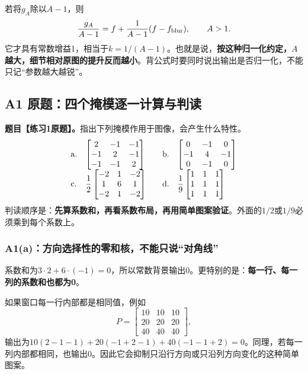 若将$g_A$除以$A-1$，则
\[
 \frac{g_A}{A-1}
 =f+\frac1{A-1}(f-f_{\rm blur}),\qquad A>1.
\]
它才具有常数增益1，相当于$k=1/(A-1)$。也就是说，\textbf{按这种归一化约定，$A$越大，细节相对原图的提升反而越小}。背公式时要同时说出输出是否归一化，不能只记“参数越大越锐”。

\subsection{A1 原题：四个掩模逐一计算与判读}
\label{original:A1}
\textbf{题目【练习1原题】。}指出下列掩模作用于图像，会产生什么特性。
\[
 \begin{array}{ll@{\qquad}ll}
 \mathrm{a.}&\begin{bmatrix}2&-1&-1\\-1&2&-1\\-1&-1&2\end{bmatrix}&
 \mathrm{b.}&\begin{bmatrix}0&-1&0\\-1&4&-1\\0&-1&0\end{bmatrix}\\[1.1em]
 \mathrm{c.}&\dfrac12\begin{bmatrix}-2&1&-2\\1&6&1\\-2&1&-2\end{bmatrix}&
 \mathrm{d.}&\dfrac19\begin{bmatrix}1&1&1\\1&1&1\\1&1&1\end{bmatrix}
 \end{array}
\]
判读顺序是：\textbf{先算系数和，再看系数布局，再用简单图案验证}。外面的$1/2$或$1/9$必须乘到每个系数上。

\subsubsection{A1(a)：方向选择性的零和核，不能只说“对角线”}
系数和为$3\cdot2+6\cdot(-1)=0$，所以常数背景输出0。更特别的是：\textbf{每一行、每一列的系数和也都为0}。

如果窗口每一行内部都是相同值，例如
\[
 P=\begin{bmatrix}10&10&10\\20&20&20\\40&40&40\end{bmatrix},
\]
输出为$10(2-1-1)+20(-1+2-1)+40(-1-1+2)=0$。同理，若每一列内部都相同，也输出0。因此它会抑制只沿行方向或只沿列方向变化的这种简单图案。

